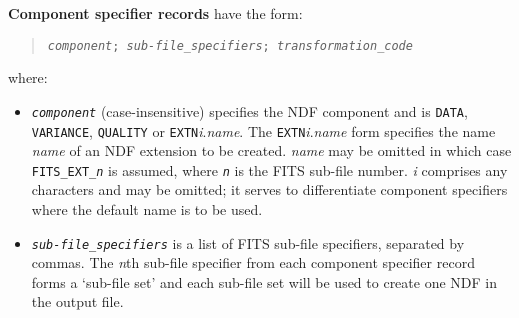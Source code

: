 \documentclass[twoside,11pt]{article}
\newcommand{\ssthitemlist}[1]{
  \latexonly{
  \mbox{} \\
  \vspace{-3.5ex}
  }
  \begin{itemize}
     #1
  \end{itemize}
}
\newcommand{\sstitem}{\item}
\newcommand{\sstitem}{\item}
\begin{document}
{{{        \textbf{Component specifier records} have the form:
        \begin{quote}
          \texttt{\textit{component}; \textit{sub-file\_specifiers};
          \textit{transformation\_code}}
        \end{quote}
        where:
           \ssthitemlist{
           \sstitem
           \texttt{\textit{component}} (case-insensitive) specifies the NDF
              component and is \texttt{DATA}, \texttt{VARIANCE}, \texttt{QUALITY} or
              \texttt{EXTN}\textit{i}.\textit{name}. The \texttt{EXTN}\textit{i}.\textit{name}
              form specifies the name \textit{name} of an NDF extension to be
              created. \textit{name} may be omitted in which case 
              \texttt{FITS\_EXT\_\textit{n}} is assumed, where
              \texttt{\textit{n}} is the FITS sub-file number.
              \textit{i} comprises any characters and may be omitted; it serves to
              differentiate component specifiers where the default name is to
              be used.
           \sstitem
           \texttt{\textit{sub-file\_specifiers}} is a list of FITS sub-file
              specifiers, separated by commas. The \textit{n}th sub-file
              specifier from each component specifier record forms a
              `sub-file set' and each
              sub-file set will be used to create one NDF in the output
              file.

}}}}
\end{document}
